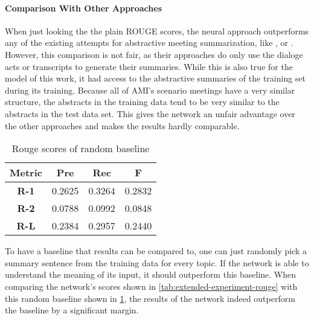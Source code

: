 \paragraph{Comparison With Other Approaches}

When just looking the the plain ROUGE scores, the neural approach outperforms any of the existing attempts for abstractive meeting summarization, like \cite{oya-etal-2014-template}, \cite{1609.07035} or \cite{shang-etal-2018-unsupervised}.
However, this comparison is not fair, as their approaches do only use the dialoge acts or transcripts to generate their summaries.
While this is also true for the model of this work, it had access to the abstractive summaries of the training set during its training.
Because all of AMI's scenario meetings have a very similar structure, the abstracts in the training data tend to be very similar to the abstracts in the test data set.
This gives the network an unfair advantage over the other approaches and makes the results hardly comparable.

\begin{table}[h]
\centering
\begin{tabular}{@{}clll@{}}
\toprule
\textbf{Metric} & \multicolumn{1}{c}{\textbf{Pre}} & \multicolumn{1}{c}{\textbf{Rec}} & \multicolumn{1}{c}{\textbf{F}} \\ \midrule
\textbf{R-1}    & 0.2625                           & 0.3264                           & 0.2832                         \\
\textbf{R-2}    & 0.0788                           & 0.0992                           & 0.0848                         \\
\textbf{R-L}    & 0.2384                           & 0.2957                           & 0.2440                         \\ \bottomrule
\end{tabular}
\caption{Rouge scores of random baseline}
\label{tab:extended-experiment-rouge-random}
\end{table}

To have a baseline that results can be compared to, one can just randomly pick a summary sentence from the training data for every topic.
If the network is able to understand the meaning of its input, it should outperform this baseline.
When comparing the network's scores shown in \cref{tab:extended-experiment-rouge} with this random baseline shown in \cref{tab:extended-experiment-rouge-random}, the results of the network indeed outperform the baseline by a significant margin.

